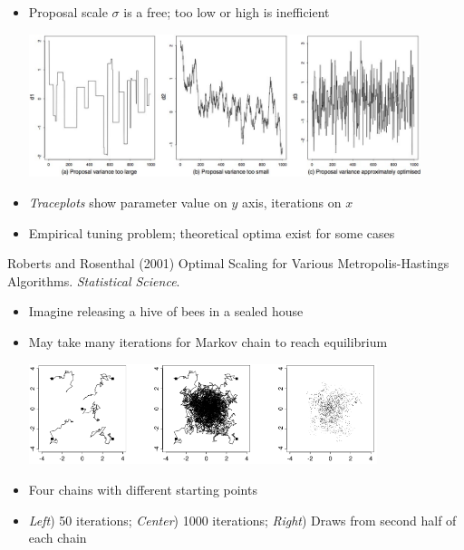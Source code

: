 \documentclass[10pt]{report}
\begin{document}
%
\begin{itemize}
\item Proposal scale $\sigma$ is a free; too low or high is inefficient
\begin{center}
\includegraphics[width=0.9\textwidth]{img/roberts-rosenthal-traceplots.jpg}
\end{center}
\item \emph{Traceplots} show parameter value on $y$ axis, iterations on $x$
\item Empirical tuning problem; theoretical optima exist for some
  cases
\end{itemize}
\vfill\hfill
{\tiny Roberts and Rosenthal (2001) Optimal Scaling for Various
  Metropolis-Hastings Algorithms. {\slshape Statistical Science}.}


%
\begin{itemize}
\item Imagine releasing a hive of bees in a sealed house
\item May take many iterations for Markov chain to reach equilibrium
\vspace*{3pt}
\begin{center}
\includegraphics[width=0.8\textwidth]{img/bda-diffuse-converge.png}
\end{center}
\item Four chains with different starting points
\item \emph{Left}) 50 iterations;  \emph{Center}) 1000 iterations;  \emph{Right}) Draws from second half of each chain
\end{itemize}
\end{document}
